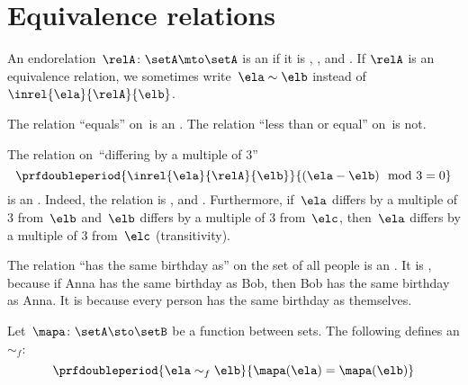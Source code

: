 
\section{Equivalence relations}

\begin{ctdefinition}
    \label{def:equivalence-relation}
    An endorelation~$\relA\colon \setA\mto \setA$ is an  if it is , , and .
   If $\relA$ is an equivalence relation, we sometimes write~$\ela\sim \elb$ instead of~$\inrel{\ela}{\relA}{\elb}$.
\end{ctdefinition}

\begin{example}
    The relation ``equals'' on~\natnumbers  is an .
    The relation ``less than or equal'' on~\natnumbers  is not.
\end{example}

\begin{example}
    The relation on~\natnumbers  ``differing by a multiple of 3''
    \begin{equation}
        \prfdoubleperiod{
            \inrel{\ela}{\relA}{\elb}
        }{
            (\ela-\elb) \mod 3 = 0
        }
    \end{equation}
    is an .
    Indeed, the relation is , and .
    Furthermore, if~$\ela$ differs by a multiple of 3 from~$\elb$ and~$\elb$ differs by a multiple of 3 from~$\elc$, then~$\ela$ differs by a multiple of 3 from~$\elc$ (transitivity).
\end{example}

\begin{example}
    The relation ``has the same birthday as'' on the set of all people is an .
    It is , because if Anna has the same birthday as Bob, then Bob has the same birthday as Anna.
    It is  because every person has the same birthday as themselves.
\end{example}

\begin{example}
    Let~$\mapa\colon \setA \sto \setB$ be a function between sets.
    The following defines an  $\sim_f$:
    \begin{equation}
        \prfdoubleperiod{
            \ela\sim_f \elb
        }{
            \mapa(\ela)=\mapa(\elb)
        }
    \end{equation}
\end{example}

